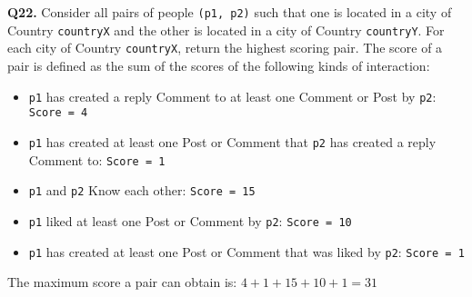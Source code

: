 \textbf{Q22.}
Consider all pairs of people \texttt{(p1,\ p2)} such that one is located
in a city of Country \texttt{countryX} and the other is located in a
city of Country \texttt{countryY}.
For each city of Country \texttt{countryX}, return the highest scoring
pair.
The score of a pair is defined as the sum of the scores of the following
kinds of interaction:
\begin{itemize}
\vspace{-1.5ex}
\item
  \texttt{p1} has created a reply Comment to at least one Comment or
  Post by \texttt{p2}: \texttt{Score\ =\ 4}
\item
  \texttt{p1} has created at least one Post or Comment that \texttt{p2}
  has created a reply Comment to: \texttt{Score\ =\ 1}
\item
  \texttt{p1} and \texttt{p2} Know each other: \texttt{Score\ =\ 15}
\item
  \texttt{p1} liked at least one Post or Comment by \texttt{p2}:
  \texttt{Score\ =\ 10}
\item
  \texttt{p1} has created at least one Post or Comment that was liked by
  \texttt{p2}: \texttt{Score\ =\ 1}
\vspace{-1.5ex}
\end{itemize}
The maximum score a pair can obtain is: $4 + 1 + 15 + 10 + 1 = 31$
